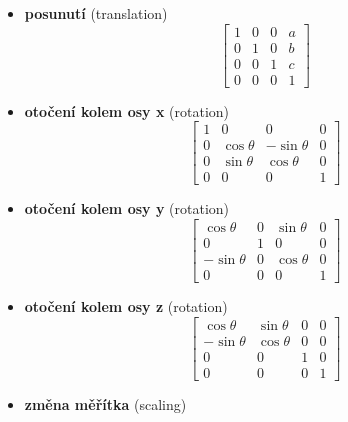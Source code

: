 \begin{itemize}
	\item \textbf{posunutí} (translation)
		\begin{equation*}
			 \begin{bmatrix}
			     1 & 0 & 0 & a      \\[0.3em]
    			 0 & 1 & 0 & b      \\[0.3em]
    			 0 & 0 & 1 & c      \\[0.3em]
     			 0 & 0 & 0 & 1      
			  \end{bmatrix}
		\end{equation*}
	\item \textbf{otočení kolem osy x} (rotation)
		\begin{equation*}
			 \begin{bmatrix}
     			 1 & 0 & 0 & 0        					\\[0.3em]
			     0 & \cos{\theta} & -\sin{\theta} & 0    	\\[0.3em]
    			 0 & \sin{\theta} & \cos{\theta} & 0       \\[0.3em]
     			 0 & 0 & 0 & 1      
			  \end{bmatrix}
		\end{equation*}
	\item \textbf{otočení kolem osy y} (rotation)
		\begin{equation*}
			 \begin{bmatrix}
			     \cos{\theta} & 0 & \sin{\theta} &  0      	\\[0.3em]
     			 0 & 1 & 0 & 0        						\\[0.3em]
    			 -\sin{\theta} & 0 & \cos{\theta} & 0       \\[0.3em]
     			 0 & 0 & 0 & 1      
			  \end{bmatrix}
		\end{equation*}
	\item \textbf{otočení kolem osy z} (rotation)
		\begin{equation*}
			 \begin{bmatrix}
			     \cos{\theta} & \sin{\theta} & 0  & 0      	\\[0.3em]
    			 -\sin{\theta} & \cos{\theta} & 0 & 0       \\[0.3em]
     			 0 & 0 & 1 & 0        						\\[0.3em]
     			 0 & 0 & 0 & 1      
			  \end{bmatrix}
		\end{equation*}
\item \textbf{změna měřítka} (scaling)

\end{itemize}
